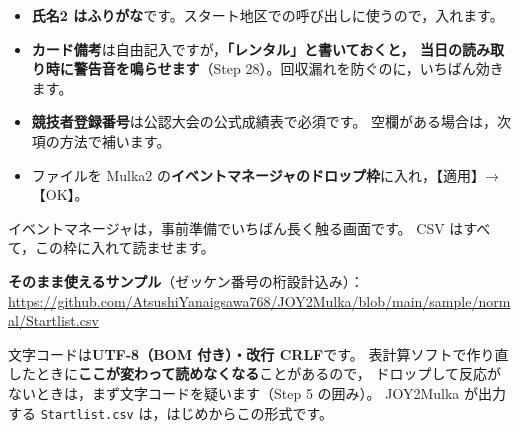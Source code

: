 \begin{itemize}
\item \textbf{氏名2 はふりがな}です。スタート地区での呼び出しに使うので，入れます。
\item \textbf{カード備考}は自由記入ですが，\textbf{「レンタル」と書いておくと，
      当日の読み取り時に警告音を鳴らせます}（Step 28）。回収漏れを防ぐのに，いちばん効きます。
\item \textbf{競技者登録番号}は公認大会の公式成績表で必須です。\tRANK
      空欄がある場合は，次項の方法で補います。
\item ファイルを Mulka2 の\textbf{イベントマネージャのドロップ枠}に入れ，【適用】→【OK】。
\end{itemize}

イベントマネージャは，事前準備でいちばん長く触る画面です。
CSV はすべて，この枠に入れて読ませます。

\textbf{そのまま使えるサンプル}（ゼッケン番号の桁設計込み）：\\
\url{https://github.com/AtsushiYanaigsawa768/JOY2Mulka/blob/main/sample/normal/Startlist.csv}

文字コードは\textbf{UTF-8（BOM 付き）・改行 CRLF}です。
表計算ソフトで作り直したときに\textbf{ここが変わって読めなくなる}ことがあるので，
ドロップして反応がないときは，まず文字コードを疑います（Step 5 の囲み）。
JOY2Mulka が出力する \texttt{Startlist.csv} は，はじめからこの形式です。

